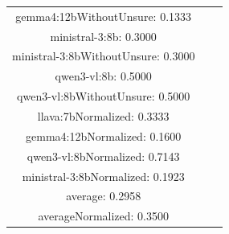 \documentclass[a4paper]{article}
\begin{document}
\begin{tabular}{ccc}
gemma4:12bWithoutUnsure: 0.1333 \\ ministral-3:8b: 0.3000 \\ ministral-3:8bWithoutUnsure: 0.3000 \\ qwen3-vl:8b: 0.5000 \\ qwen3-vl:8bWithoutUnsure: 0.5000 \\ llava:7bNormalized: 0.3333 \\ gemma4:12bNormalized: 0.1600 \\ qwen3-vl:8bNormalized: 0.7143 \\ ministral-3:8bNormalized: 0.1923 \\ average: 0.2958 \\ averageNormalized: 0.3500 \end{minipage}\\
\end{tabular}

\vspace{5mm}
\end{document}
